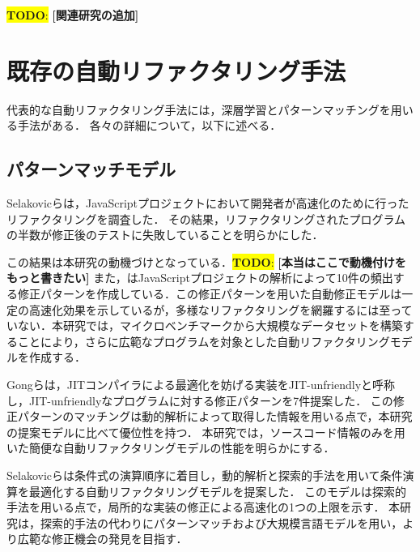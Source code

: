 \documentclass[11pt]{jreport}
\newcommand{\todo}[1]{\colorbox{yellow}{{\bf TODO}:}{\color{red} {\textbf{[#1]}}}}
\begin{document}
\todo{関連研究の追加}




\section{既存の自動リファクタリング手法}


代表的な自動リファクタリング手法には，深層学習とパターンマッチングを用いる手法がある．
各々の詳細について，以下に述べる．




\subsection{パターンマッチモデル}


Selakovicら\cite{Selakovic_2016}は，JavaScriptプロジェクトにおいて開発者が高速化のために行ったリファクタリングを調査した．
その結果，リファクタリングされたプログラムの半数が修正後のテストに失敗していることを明らかにした．

この結果は本研究の動機づけとなっている．\todo{本当はここで動機付けをもっと書きたい}
また，\cite{Selakovic_2016}はJavaScriptプロジェクトの解析によって10件の頻出する修正パターンを作成している．この修正パターンを用いた自動修正モデルは一定の高速化効果を示しているが，多様なリファクタリングを網羅するには至っていない．本研究では，マイクロベンチマークから大規模なデータセットを構築することにより，さらに広範なプログラムを対象とした自動リファクタリングモデルを作成する．

Gongら\cite{Gong_2015}は，JITコンパイラによる最適化を妨げる実装をJIT-unfriendlyと呼称し，JIT-unfriendlyなプログラムに対する修正パターンを7件提案した．
この修正パターンのマッチングは動的解析によって取得した情報を用いる点で，本研究の提案モデルに比べて優位性を持つ．
本研究では，ソースコード情報のみを用いた簡便な自動リファクタリングモデルの性能を明らかにする．

Selakovicら\cite{Selakovic_2017}は条件式の演算順序に着目し，動的解析と探索的手法を用いて条件演算を最適化する自動リファクタリングモデルを提案した．
このモデルは探索的手法を用いる点で，局所的な実装の修正による高速化の1つの上限を示す．
本研究は，探索的手法の代わりにパターンマッチおよび大規模言語モデルを用い，より広範な修正機会の発見を目指す．
\end{document}
